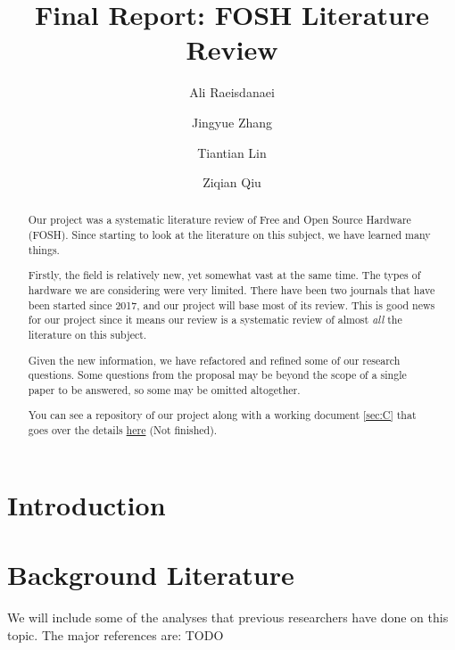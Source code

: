 \documentclass[acmtog]{acmart}
\begin{document}
\title{Final Report: FOSH Literature Review}

\author{Ali Raeisdanaei}

\author{Jingyue Zhang}

\author{Tiantian Lin}

\author{Ziqian Qiu}

\begin{abstract}
Our project was a systematic literature review of Free and Open Source Hardware (FOSH).
Since starting to look at the literature on this subject, we have learned many things. 

Firstly, the field is relatively new, yet somewhat vast at the same time. 
The types of hardware we are considering were very limited.
There have been two journals that have been started since 2017, and our project will base most of its review. 
This is good news for our project since it means our review is a systematic review of almost \textit{all} the literature on this subject. 

Given the new information, we have refactored and refined some of our research questions. 
Some questions from the proposal may be beyond the scope of a single paper to be answered, so some may be omitted altogether. 

You can see a repository of our project along with a working document \ref{sec:C} that goes over the details
\href{https://github.com/aliraeisdanaei/FOSH_Lit_Review/}{here}
(Not finished).
\end{abstract}


\maketitle

\section{Introduction}

\section{Background Literature}
We will include some of the analyses that previous researchers have done on this topic. The major references are: TODO
\end{document}
